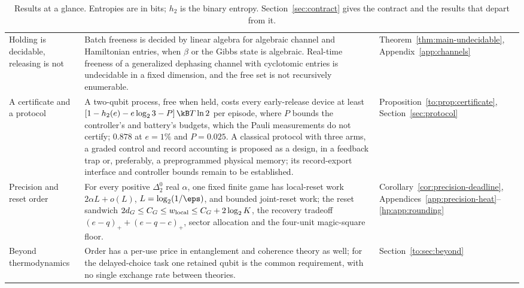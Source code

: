 \begin{table}[tbp]
\begin{tabular}{@{}>{\raggedright\arraybackslash}p{3.1cm}>{\raggedright\arraybackslash}p{10.0cm}>{\raggedright\arraybackslash}p{2.5cm}@{}}
Holding is decidable, releasing is not & Batch freeness is decided by linear algebra for algebraic channel and Hamiltonian entries, when $\beta$ or the Gibbs state is algebraic. Real-time freeness of a generalized dephasing channel with cyclotomic entries is undecidable in a fixed dimension, and the free set is not recursively enumerable. & Theorem~\ref{thm:main-undecidable}, Appendix~\ref{app:channels}\\
A certificate and a protocol & A two-qubit process, free when held, costs every early-release device at least $[1-h_2(e)-e\log_23-P]\,\kB T\ln2$ per episode, where $P$ bounds the controller's and battery's budgets, which the Pauli measurements do not certify; $0.878$ at $e=1\%$ and $P=0.025$. A classical protocol with three arms, a graded control and record accounting is proposed as a design, in a feedback trap or, preferably, a preprogrammed physical memory; its record-export interface and controller bounds remain to be established. & Proposition~\ref{to:prop:certificate}, Section~\ref{sec:protocol}\\
Precision and reset order & For every positive $\Delta^0_2$ real $\alpha$, one fixed finite game has local-reset work $2\alpha L+o(L)$, $L=\log_2(1/\eps)$, and bounded joint-reset work; the reset sandwich $2d_G\le C_G\le w_{\rm local}\le C_G+2\log_2K$, the recovery tradeoff $(e-q)_++(e-q-c)_+$, sector allocation and the four-unit magic-square floor. & Corollary~\ref{cor:precision-deadline}, Appendices~\ref{app:precision-heat}--\ref{hp:app:rounding}\\
Beyond thermodynamics & Order has a per-use price in entanglement and coherence theory as well; for the delayed-choice task one retained qubit is the common requirement, with no single exchange rate between theories. & Section~\ref{to:sec:beyond}\\
\bottomrule
\end{tabular}
\caption{Results at a glance. Entropies are in bits; $h_2$ is the binary entropy. Section~\ref{sec:contract} gives the contract and the results that depart from it.}
\label{tab:glance}
\end{table}

